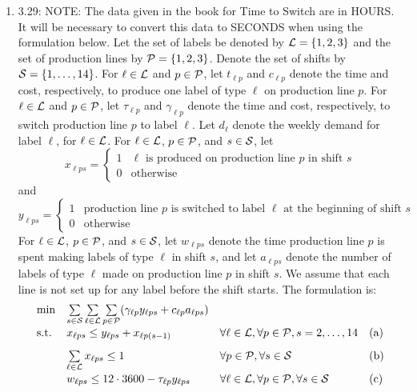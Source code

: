 \documentclass[10pt]{article}
\begin{document}
\begin{enumerate}
\item 3.29: NOTE:  The data given in the book for Time to Switch are in HOURS.  It will be necessary to convert this data to SECONDS when using the formulation below.  Let the set of labels be denoted by ${\cal L} = \{1,2,3\}$ and
  the set of production lines by ${\cal P} = \{1,2,3\}$. Denote the set of
  shifts by ${\cal S} = \{1,\ldots,14\}$. For $\ell \in {\cal L}$
  and $p \in {\cal P}$, let $t_{\ell p}$ and $c_{\ell p}$ denote the time
  and cost, respectively, to produce one label of type $\ell$ on production line
  $p$. For $\ell \in {\cal L}$ and $p \in {\cal P}$, let $\tau_{\ell p}$
  and $\gamma_{\ell p}$
  denote the time and cost, respectively, to switch production line $p$ to label $\ell$. Let $d_\ell$ denote the weekly demand for label $\ell$, for
  $\ell \in {\cal L}$. For $\ell \in {\cal L}$, $p \in {\cal P}$, and $s \in {\cal S}$, let
    \[
    x_{\ell p s} = \left\{
    \begin{array}{ll}
      1 & \mbox{$\ell$ is produced on production line $p$ in shift $s$} \\
      0 & \mbox{otherwise}
    \end{array}
  \right.
  \]
  and
  \[
  y_{\ell p s} = \left\{
    \begin{array}{ll}
      1 & \mbox{production line $p$ is switched to label $\ell$ at the
        beginning of shift $s$} \\
      0 & \mbox{otherwise}
    \end{array}
  \right.
  \]
  For $\ell \in {\cal L}$, $p \in {\cal P}$, and $s \in {\cal S}$, let $w_{\ell p s}$ denote the time production line $p$ is spent making
  labels of type $\ell$ in shift $s$, and let $a_{\ell p s}$ denote the number of
  labels of type $\ell$ made on production line $p$ in shift $s$.
  We assume that each line is not set up for any label before the
  shift starts. The formulation is:
  \[
  \begin{array}{llll}
    \min & \sum\limits_{s \in {\cal S}} \sum\limits_{\ell \in {\cal L}} \sum\limits_{p \in {\cal P}}
    (\gamma_{\ell p} y_{\ell p s} + c_{\ell p} a_{\ell p s}) & & \\[3mm]
    \mbox{s.t.} & x_{\ell p s} \leq y_{\ell p s} + x_{\ell p (s-1)} &
    \forall \ell \in {\cal L}, \forall p \in {\cal P}, s = 2,\ldots, 14 &
    \mbox{(a)} \\[3mm]
    & \sum\limits_{\ell \in {\cal L}} x_{\ell p s} \leq 1 & \forall p \in {\cal P}, \forall s
    \in {\cal S} & \mbox{(b)} \\[3mm]
    & w_{\ell p s} \leq 12\cdot 3600 - \tau_{\ell p}
    y_{\ell p s} & \forall \ell \in {\cal L}, \forall p \in {\cal P}, \forall s \in {\cal S} & \mbox{(c)}

\end{array}\]
\end{enumerate}
\end{document}

